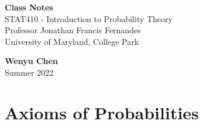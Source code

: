 \documentclass[11pt,oneside]{book}
\theoremstyle{break}
\theoremstyle{break}
\begin{document}
	\begin{titlepage}
		\begin{center}
			\vspace*{\fill}
			\Huge \color{red}
				\textbf{Class Notes}\\
				\color{black}
			\vspace{0.5cm}			
			\Large 
				STAT410 - Introduction to Probability Theory\\
				Professor Jonathan Francis Fernandes\\
				University of Maryland, College Park
			\vspace{3cm}

			
			
			\vspace{5cm}
			\LARGE
				\textbf{Wenyu Chen}\\
				\hfill\break
				\LARGE Summer 2022\\
				\color{black}
			\vspace{5cm}

		\vspace*{\fill}
		\author{Wenyu Chen} \date{Summer 2022}
		\end{center}			
	\end{titlepage}
	\newpage
	\tableofcontents
	\newpage
	\chapter[Axioms of Probabilities]{\color{WildStrawberry}Axioms of Probabilities\color{black}}
\end{document}

